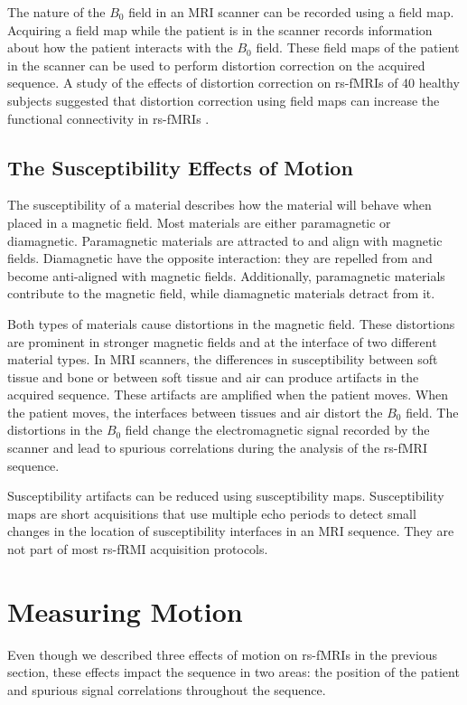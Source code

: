 The nature of the $B_0$ field in an MRI scanner can be recorded using a field map. Acquiring a field map while the patient is in the scanner records information about how the patient interacts with the $B_0$ field. These field maps of the patient in the scanner can be used to perform distortion correction on the acquired sequence. A study of the effects of distortion correction on rs-fMRIs of 40 healthy subjects suggested that distortion correction using field maps can increase the functional connectivity in rs-fMRIs \cite{Togo2017}.

\subsection{The Susceptibility Effects of Motion}

The susceptibility of a material describes how the material will behave when placed in a magnetic field. Most materials are either paramagnetic or diamagnetic. Paramagnetic materials are attracted to and align with magnetic fields. Diamagnetic have the opposite interaction: they are repelled from and become anti-aligned with magnetic fields. Additionally, paramagnetic materials contribute to the magnetic field, while diamagnetic materials detract from it. 

Both types of materials cause distortions in the magnetic field. These distortions are prominent in stronger magnetic fields and at the interface of two different material types. In MRI scanners, the differences in susceptibility between soft tissue and bone or between soft tissue and air can produce artifacts in the acquired sequence. These artifacts are amplified when the patient moves. When the patient moves, the interfaces between tissues and air distort the $B_0$ field. The distortions in the $B_0$ field change the electromagnetic signal recorded by the scanner and lead to spurious correlations during the analysis of the rs-fMRI sequence.

Susceptibility artifacts can be reduced using susceptibility maps. Susceptibility maps are short acquisitions that use multiple echo periods to detect small changes in the location of susceptibility interfaces in an MRI sequence. They are not part of most rs-fRMI acquisition protocols.

\section{Measuring Motion}

Even though we described three effects of motion on rs-fMRIs in the previous section, these effects impact the sequence in two areas: the position of the patient and spurious signal correlations throughout the sequence.

